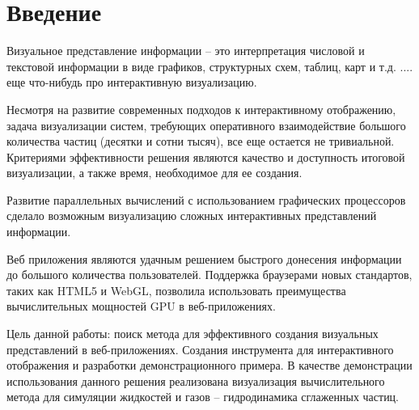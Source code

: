 \newpage
\section*{Введение}



Визуальное представление информации -- это интерпретация числовой и текстовой
информации в виде графиков, структурных схем, таблиц, карт и т.д.
.... еще что-нибудь про интерактивную визуализацию.

Несмотря на развитие современных подходов к интерактивному отображению, задача
визуализации систем, требующих оперативного взаимодействие большого количества
частиц (десятки и сотни тысяч), все еще остается не тривиальной. Критериями 
эффективности решения являются качество и доступность итоговой визуализации, 
а также время, необходимое для ее создания.

Развитие параллельных вычислений с использованием графических процессоров сделало 
возможным визуализацию сложных интерактивных представлений информации. 

Веб приложения являются удачным решением быстрого донесения информации до большого
количества пользователей. Поддержка браузерами новых стандартов, таких как HTML5 и WebGL,  
позволила использовать преимущества вычислительных мощностей GPU в веб-приложениях.

Цель данной работы: поиск метода для эффективного создания визуальных представлений 
в веб-приложениях. Создания инструмента для интерактивного отображения и разработки
демонстрационного примера. В качестве демонстрации использования данного решения реализована 
визуализация вычислительного метода для симуляции жидкостей и газов -- гидродинамика 
сглаженных частиц.


